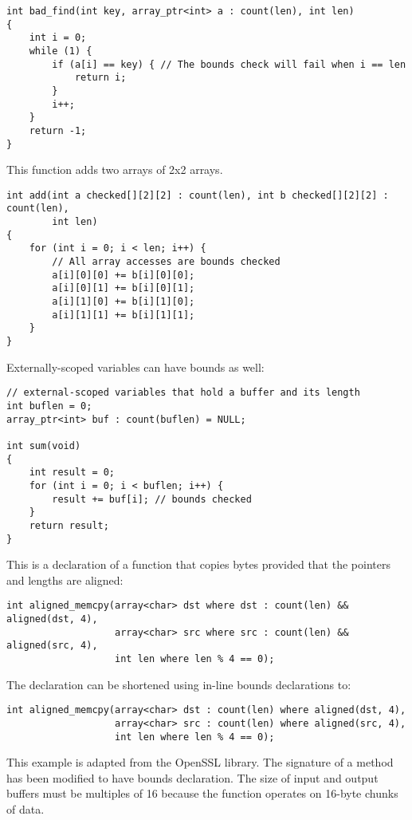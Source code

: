 \begin{lstlisting}
int bad_find(int key, array_ptr<int> a : count(len), int len)
{
    int i = 0;
    while (1) {
        if (a[i] == key) { // The bounds check will fail when i == len
            return i;
        }
        i++;
    }
    return -1;
}

\end{lstlisting}

This function adds two arrays of 2x2 arrays.

\begin{lstlisting}
int add(int a checked[][2][2] : count(len), int b checked[][2][2] : count(len), 
        int len) 
{
    for (int i = 0; i < len; i++) {
        // All array accesses are bounds checked
        a[i][0][0] += b[i][0][0]; 
        a[i][0][1] += b[i][0][1];
        a[i][1][0] += b[i][1][0];
        a[i][1][1] += b[i][1][1];
    }
}
\end{lstlisting}

Externally-scoped variables can have bounds as well:

\begin{lstlisting}
// external-scoped variables that hold a buffer and its length
int buflen = 0;
array_ptr<int> buf : count(buflen) = NULL;

int sum(void)
{
    int result = 0;
    for (int i = 0; i < buflen; i++) {
        result += buf[i]; // bounds checked
    }
    return result;
}
\end{lstlisting}

This is a declaration of a function that copies bytes provided that the
pointers and lengths are aligned:
\begin{lstlisting}
int aligned_memcpy(array<char> dst where dst : count(len) && aligned(dst, 4),
                   array<char> src where src : count(len) && aligned(src, 4),
                   int len where len % 4 == 0);
\end{lstlisting}

The declaration can be shortened using in-line bounds declarations to:

\begin{lstlisting}
int aligned_memcpy(array<char> dst : count(len) where aligned(dst, 4),
                   array<char> src : count(len) where aligned(src, 4),
                   int len where len % 4 == 0);
\end{lstlisting}

This example is adapted from the OpenSSL library. The signature of a
method has been modified to have bounds declaration. The size of input
and output buffers must be multiples of 16 because the function operates
on 16-byte chunks of data.

